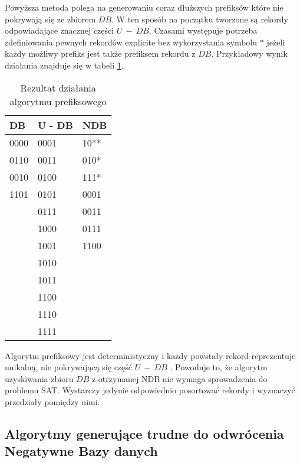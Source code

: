 \begin{explanation}
    Powyższa metoda polega na generowaniu coraz dłuższych prefiksów które nie pokrywają się ze zbiorem $DB$.
    W ten sposób na początku tworzone są rekordy odpowiadające znacznej części $U~-~DB$. Czasami występuje potrzeba zdefiniowania pewnych rekordów explicite bez wykorzystania symbolu $*$ jeżeli każdy możliwy prefiks jest także prefiksem rekordu z $DB$. 
    Przykładowy wynik działania znajduje się w tabeli \ref{tbl:prefix_results}.
    
    \begin{table}[h]
        \centering
        \begin{tabular}{|l|l|l|}
            \hline
            DB   & U - DB & NDB  \\ \hline
            0000 & 0001   & 10** \\
            0110 & 0011   & 010* \\
            0010 & 0100   & 111* \\
            1101 & 0101   & 0001 \\
            & 0111   & 0011 \\
            & 1000   & 0111 \\
            & 1001   & 1100 \\
            & 1010   &      \\
            & 1011   &      \\
            & 1100   &      \\
            & 1110   &      \\
            & 1111   &      \\ \hline
        \end{tabular}
        \caption{Rezultat działania algorytmu prefiksowego}
        \label{tbl:prefix_results}
    \end{table}
    
    
\end{explanation}
Algorytm prefiksowy jest deterministyczny i każdy powstały rekord reprezentuje unikalną, nie pokrywającą się część $U~-~DB$ \cite{NRI-Esponda}.
Powoduje to, że algorytm uzyskiwania zbioru $DB$ z otrzymanej NDB nie wymaga sprowadzenia do problemu SAT. Wystarczy jedynie odpowiednio posortować rekordy i wyznaczyć przedziały pomiędzy nimi.

\subsection{Algorytmy generujące trudne do odwrócenia Negatywne Bazy danych}
